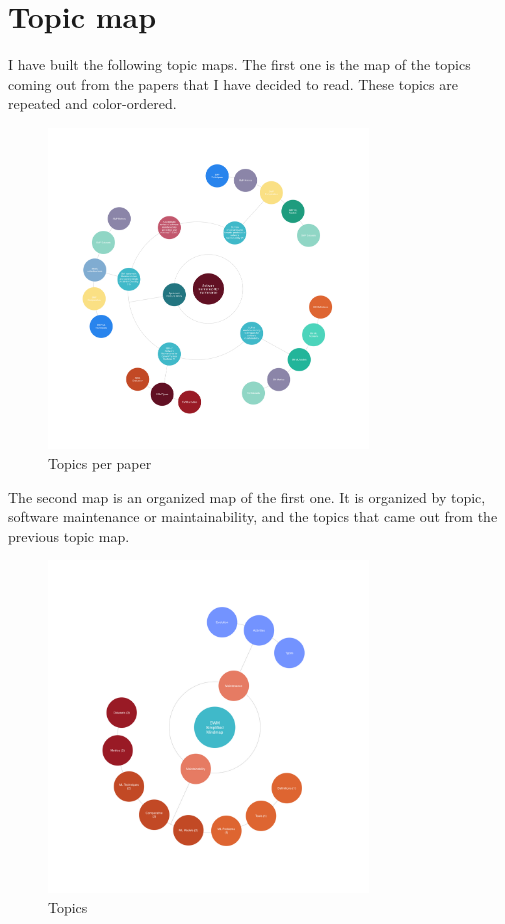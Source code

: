 \documentclass[article]{IEEEtran}
\begin{document}
\section{Topic map}
I have built the following topic maps. The first one is the map of the topics coming out from the papers that I have decided to read. These topics are repeated and color-ordered.

\begin{figure}[htp]
    \centering
    \includegraphics[width=8.5cm]{topics_per_paper.png}
    \caption{Topics per paper}
    \label{fig:topicspp}
\end{figure}

The second map is an organized map of the first one. It is organized by topic, software maintenance or maintainability, and the topics that came out from the previous topic map.

\begin{figure}[htp]
    \centering
    \includegraphics[width=8.5cm]{topics.png}
    \caption{Topics}
    \label{fig:topics}
\end{figure}
\end{document}
